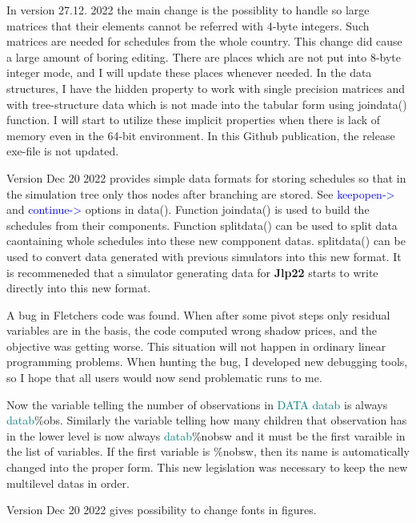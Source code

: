 In version 27.12. 2022 the main change is the possiblity to handle so large matrices that their 
elements cannot be referred with 4-byte integers. Such matrices are needed for schedules from the whole 
country. This change did cause a large amount of boring editing. 
There are places which are not put into 8-byte integer mode, and I will update 
these places whenever needed. 
In the data structures, I have the hidden property to work with single precision matrices and with tree-structure 
data which is not made into the tabular form using \textcolor{VioletRed}{joindata}() function. I will start to 
utilize these implicit properties when there is lack of memory even in the 64-bit environment. 
In this Github publication, 
the release exe-file is not updated. 
 
Version Dec 20 2022 provides simple data formats for storing schedules so that in the simulation tree only thos 
nodes after branching are stored. See \textcolor{blue}{keepopen->} and \textcolor{blue}{continue->} options in \textcolor{VioletRed}{data}(). Function \textcolor{VioletRed}{joindata}() is 
used to build the schedules from their components. Function \textcolor{VioletRed}{splitdata}() can be used to split data caontaining whole 
schedules into these new compponent datas. \textcolor{VioletRed}{splitdata}() can be used to convert data generated with previous simulators 
into this new format. It is recommeneded that a simulator generating data for \textbf{Jlp22} 
starts to write directly into this new format. 
 
A bug in Fletchers code was found. When after some pivot steps only residual variables 
are in the basis, the code computed wrong shadow prices, and the objective was getting worse. 
This situation will not happen in ordinary linear programming problems. When hunting the bug, I developed new 
debugging tools, so I hope that all users would now send problematic 
runs to me. 
 
Now the variable telling the number of observations in \textcolor{teal}{DATA} \textcolor{teal}{datab} is always \textcolor{teal}{datab}\%obs. 
Similarly the variable 
telling how many children that observation has in the lower level 
is now always \textcolor{teal}{datab}\%nobsw and it must be the 
first varaible in the list of variables. If the first variable is \%nobsw, then its name is automatically 
changed into the proper form. This new legislation was necessary to keep the new multilevel 
datas in order. 
 
Version Dec 20 2022 gives possibility to change fonts in figures. 
 
